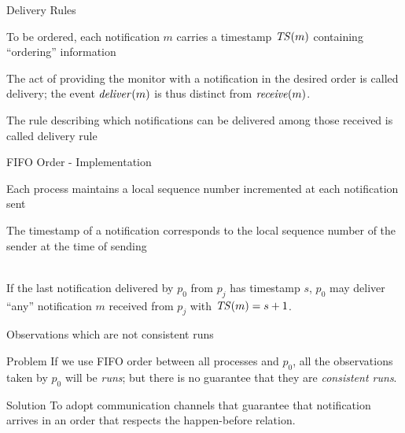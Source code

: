 \begin{frame}{Delivery Rules}

\BI
\item To be ordered, each notification $m$ carries a \alert{timestamp} $\mathit{TS}(m)$ 
  containing ``ordering'' information
\item The act of providing the monitor with a notification in the desired order
  is called \alert{delivery}; the event $\mathit{deliver}(m)$ is thus distinct from
  $\mathit{receive}(m)$.
\item The rule describing which notifications can be delivered among those 
  received is called \alert{delivery rule}
\EI

\end{frame}


\begin{frame}{FIFO Order - Implementation} 
	
\BI
\item Each process maintains a \alert{local sequence number} incremented at
  each notification sent
\item The timestamp of a notification corresponds to the local sequence number
  of the sender at the time of sending
\EI

\begin{definition}~\\
  If the last notification delivered by $p_0$ from $p_j$ has timestamp
  $s$, $p_0$ may deliver ``any'' notification $m$ received from $p_j$ with $\mathit{TS}(m)=s+1$.
\end{definition}

\end{frame}



\begin{frame}{Observations which are not consistent runs}

\begin{block}{Problem} 
If we use FIFO order between all processes and $p_0$, all the observations taken by $p_0$ will be \emph{runs};
but there is no guarantee that they are \emph{consistent runs}.
\end{block}

\pause
\bigskip
\begin{block}{Solution}
To adopt communication channels that guarantee that notification arrives
in an order that respects the happen-before relation.
\end{block}

\end{frame}

